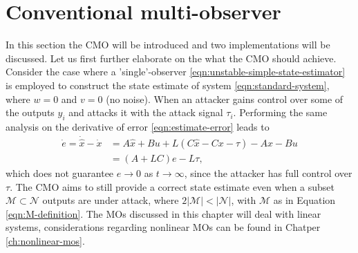 \section{Conventional multi-observer}\label{ch:cmo}
In this section the CMO will be introduced and two implementations will be discussed. Let us first further elaborate on the what the CMO should achieve. Consider the case where a 'single'-observer \eqref{eqn:unstable-simple-state-estimator} is employed to construct the state estimate of system \eqref{eqn:standard-system}, where $w=0$ and $v=0$ (no noise). When an attacker gains control over some of the outputs $y_i$ and attacks it with the attack signal $\tau_i$. Performing the same analysis on the derivative of error \eqref{eqn:estimate-error} leads to
\begin{equation*}
    \begin{split}
        \dot{e} = \dot{\hat{x}} - \dot{x} &= A\hat{x} + Bu + L(C\hat{x} - Cx - \tau) - Ax - Bu \\
        &= (A+LC)e - L\tau,
    \end{split}
\end{equation*}
which does not guarantee $e \rightarrow 0$ as $t \rightarrow \infty$, since the attacker has full control over $\tau$. The CMO aims to still provide a correct state estimate even when a subset $\mathcal{M} \subset \mathcal{N}$ outputs are under attack, where $2|\mathcal{M}| < |\mathcal{N}|$, with $\mathcal{M}$ as in Equation \eqref{eqn:M-definition}. The MOs discussed in this chapter will deal with linear systems, considerations regarding nonlinear MOs can be found in Chatper \ref{ch:nonlinear-mos}.

